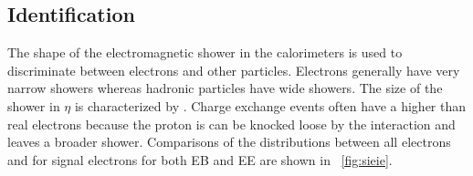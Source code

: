 \subsection{Identification}

The shape of the electromagnetic shower in the calorimeters is used to
discriminate between electrons and other particles. Electrons generally have
very narrow showers whereas hadronic particles have wide showers. The size of
the shower in $\eta$ is characterized by \sigmaietaieta. Charge exchange events
often have a higher \sigmaietaieta than real electrons because the proton is
can be knocked loose by the interaction and leaves a broader shower.
Comparisons of the \sigmaietaieta distributions between all electrons and for
signal electrons for both EB and EE are shown in \FIG~\ref{fig:sieie}.

